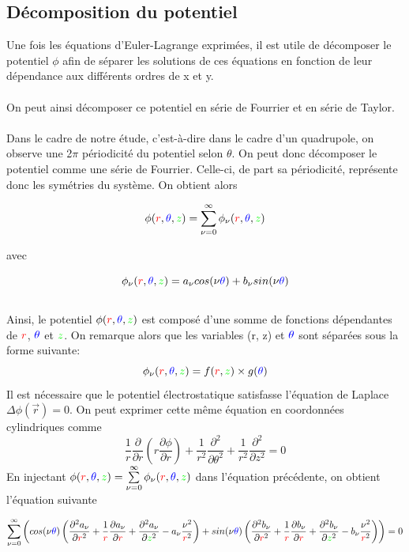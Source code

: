 \documentclass{article}
\begin{document}
\subsection{Décomposition du potentiel}
Une fois les équations d'Euler-Lagrange exprimées, il est utile de décomposer le potentiel $\phi$ afin de 
séparer les solutions de ces équations en fonction de leur dépendance aux différents ordres de x et y. 
\\
\\
On peut ainsi décomposer ce potentiel en série de Fourrier et en série de Taylor. 
\\
\\
Dans le cadre de notre étude, c'est-à-dire dans le cadre d'un quadrupole, on observe une 2$\pi$ périodicité 
du potentiel selon $\theta$.
On peut donc décomposer le potentiel comme une série de Fourrier. Celle-ci, de part sa périodicité, représente 
donc les symétries du système. On obtient alors 

\[
\phi ({\color{red}r},{\color{blue}\theta},{\color{green}z})=\sum\limits_{\nu =0}^{\infty} \phi_\nu ({\color{red}r},{\color{blue}\theta},{\color{green}z})
\]

avec 

\[
\phi_\nu ({\color{red}r},{\color{blue}\theta},{\color{green}z})=a_\nu cos(\nu{\color{blue}\theta})+b_\nu sin(\nu {\color{blue}\theta})
\]
\\ 
Ainsi, le potentiel $\phi ({\color{red}r},{\color{blue}\theta},{\color{green}z})$ est composé d'une somme de fonctions dépendantes de 
${\color{red}r}$, ${\color{blue}\theta}$ et ${\color{green}z}$. On remarque alors que les variables 
({\color{red}r}, {\color{green}z}) et ${\color{blue}\theta}$ sont séparées sous la forme suivante: 
\[
\phi_\nu ({\color{red}r},{\color{blue}\theta},{\color{green}z})=f({\color{red}r},{\color{green}z})\times g({\color{blue}\theta})
\]
Il est nécessaire que le potentiel électrostatique satisfasse l'équation de Laplace $\Delta \phi(\vec{r})=0$. On peut
exprimer cette même équation en coordonnées cylindriques comme  
\[
\frac{1}{r} \frac{\partial}{\partial r} \left(r \frac{\partial \phi}{\partial r} \right) + \frac{1}{r^2} \frac{\partial^{2}}{\partial \theta ^2}
+ \frac{1}{r^2} \frac{\partial^{2}}{\partial z ^2}=0
\]
En injectant $\phi ({\color{red}r},{\color{blue}\theta},{\color{green}z})=\sum\limits_{\nu =0}^{\infty} \phi_\nu ({\color{red}r},{\color{blue}\theta},{\color{green}z})$
dans l'équation précédente, on obtient l'équation suivante

\[
\sum\limits_{\nu =0}^{\infty} \left(cos(\nu {\color{blue}\theta}) \left(\frac{\partial^{2} a_\nu}{\partial {\color{red}r}^2} + \frac{1}{{\color{red}r}} 
\frac{\partial a_\nu}{\partial {\color{red}r}} + \frac{\partial^{2} a_\nu}{\partial {\color{green}z}^2} - a_\nu \frac{\nu ^2}{{\color{red}r}^2}\right) 
+ sin(\nu {\color{blue}\theta}) \left(\frac{\partial^{2} b_\nu}{\partial {\color{red}r}^2} + \frac{1}{{\color{red}r}} \frac{\partial b_\nu}{\partial {\color{red}r}} 
+ \frac{\partial^{2} b_\nu}{\partial {\color{green}z}^2}- b_\nu \frac{\nu ^2}{{\color{red}r}^2}\right)\right) = 0
\]
\end{document}
